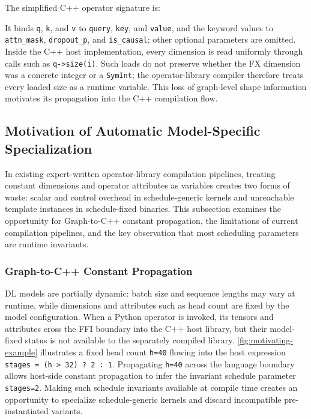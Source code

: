 \begin{example}
\label{ex:sdpa-signature}
The simplified C++ operator signature is:
\par
\noindent{}
\par
\end{example}
It binds \texttt{q}, \texttt{k}, and \texttt{v} to \texttt{query}, \texttt{key}, and \texttt{value}, and the keyword values to \texttt{attn\_mask}, \texttt{dropout\_p}, and \texttt{is\_causal}; other optional parameters are omitted. Inside the C++ host implementation, every dimension is read uniformly through calls such as \texttt{q->size(i)}. Such loads do not preserve whether the FX dimension was a concrete integer or a \texttt{SymInt}; the operator-library compiler therefore treats every loaded size as a runtime variable. This loss of graph-level shape information motivates its propagation into the C++ compilation flow.

\subsection{Motivation of Automatic Model-Specific Specialization}
\label{sec:motivation:auto-spec}

In existing expert-written operator-library compilation pipelines, treating constant dimensions and operator attributes as variables creates two forms of waste: scalar and control overhead in schedule-generic kernels and unreachable template instances in schedule-fixed binaries. This subsection examines the opportunity for Graph-to-C++ constant propagation, the limitations of current compilation pipelines, and the key observation that most scheduling parameters are runtime invariants.

\subsubsection{Graph-to-C++ Constant Propagation}
\label{sec:motivation:flow}

DL models are partially dynamic: batch size and sequence lengths may vary at runtime, while dimensions and attributes such as head count are fixed by the model configuration. When a Python operator is invoked, its tensors and attributes cross the FFI boundary into the C++ host library, but their model-fixed status is not available to the separately compiled library. \autoref{fig:motivating-example} illustrates a fixed head count \texttt{h=40} flowing into the host expression \texttt{stages = (h > 32) ? 2 : 1}. Propagating \texttt{h=40} across the language boundary allows host-side constant propagation to infer the invariant schedule parameter \texttt{stages=2}. Making such schedule invariants available at compile time creates an opportunity to specialize schedule-generic kernels and discard incompatible pre-instantiated variants.

